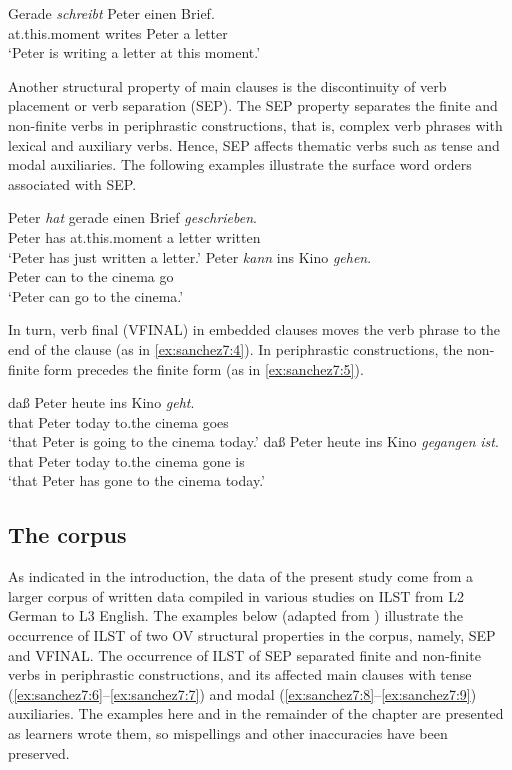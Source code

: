 \documentclass[output=paper,modfonts,nonflat, newtxmath]{langsci/langscibook}
\begin{document}
\ea%
  \label{ex:sanchez7:1}
  \gll Gerade \textit{schreibt} Peter einen Brief.\\
    at.this.moment writes Peter a letter\\
  \glt `Peter is writing a letter at this moment.’
  \z

Another structural property of main clauses is the discontinuity of verb placement or verb separation (SEP). The SEP property separates the finite and non-finite verbs in periphrastic constructions, that is, complex verb phrases with lexical and auxiliary verbs. Hence, SEP affects thematic verbs such as tense  and modal  auxiliaries. The following examples illustrate the surface word orders associated with SEP.

\ea%
  \label{ex:sanchez7:2}
  \gll Peter  \textit{hat} gerade  einen Brief  \textit{geschrieben}.  \\
    Peter has at.this.moment a letter written \\
  \glt ‘Peter has just written a letter.’
\ex %
  \label{ex:sanchez7:3}
  \gll Peter  \textit{kann} ins Kino  \textit{gehen}.  \\
    Peter can to the cinema go\\
  \glt ‘Peter can go to the cinema.’
\z


In turn, verb final (VFINAL) in embedded clauses moves the verb phrase to the end of the clause (as in \ref{ex:sanchez7:4}). In periphrastic constructions, the non-finite form precedes the finite form (as in \ref{ex:sanchez7:5}).

\ea%
  \label{ex:sanchez7:4}
  \gll  daß Peter heute ins Kino  \textit{geht}.   \\
    that Peter today to.the cinema  goes\\
  \glt ‘that Peter is going to the cinema today.’
\ex %
  \label{ex:sanchez7:5}
  \gll daß  Peter  heute  ins Kino  \textit{gegangen}  \textit{ist}.\\
    that  Peter  today  to.the cinema  gone is \\
  \glt ‘that Peter has gone to the cinema today.’
  \z

\subsection{The corpus} %


As indicated in the introduction, the data of the present study come from a larger corpus of written data compiled in various studies on ILST from L2 German to L3 English. The examples below (adapted from \citealt{Sánchez2011, Sánchez2015Background, Sánchez2016}) illustrate the occurrence of ILST of two OV structural properties in the corpus, namely, SEP and VFINAL. The occurrence of ILST of SEP separated finite and non-finite verbs in periphrastic constructions, and its affected main clauses with tense (\ref{ex:sanchez7:6}--\ref{ex:sanchez7:7}) and modal (\ref{ex:sanchez7:8}--\ref{ex:sanchez7:9}) auxiliaries. The examples here and in the remainder of the chapter are presented as learners wrote them, so mispellings and other inaccuracies have been preserved.
\end{document}
